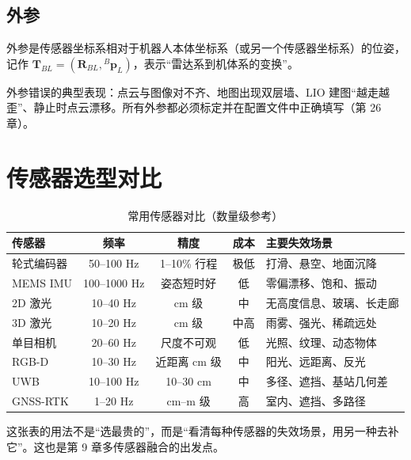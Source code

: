\subsection{外参}

\begin{definition}[外参]
外参是传感器坐标系相对于机器人本体坐标系（或另一个传感器坐标系）的位姿，记作 $\bm{T}_{BL}=(\bm{R}_{BL},{}^{B}\bm{p}_{L})$，表示“雷达系到机体系的变换”。
\end{definition}

外参错误的典型表现：点云与图像对不齐、地图出现双层墙、LIO 建图“越走越歪”、静止时点云漂移。所有外参都必须标定并在配置文件中正确填写（第 26 章）。

\section{传感器选型对比}\label{sec:03-compare}

\begin{table}[htbp]
  \centering
  \caption{常用传感器对比（数量级参考）}\label{tab:03-compare}
  \small
  \begin{tabular}{lcccl}
    \toprule
    传感器 & 频率 & 精度 & 成本 & 主要失效场景 \\
    \midrule
    轮式编码器 & 50--100 Hz & 1--10\% 行程 & 极低 & 打滑、悬空、地面沉降 \\
    MEMS IMU & 100--1000 Hz & 姿态短时好 & 低 & 零偏漂移、饱和、振动 \\
    2D 激光 & 10--40 Hz & cm 级 & 中 & 无高度信息、玻璃、长走廊 \\
    3D 激光 & 10--20 Hz & cm 级 & 中高 & 雨雾、强光、稀疏远处 \\
    单目相机 & 20--60 Hz & 尺度不可观 & 低 & 光照、纹理、动态物体 \\
    RGB-D & 10--30 Hz & 近距离 cm 级 & 中 & 阳光、远距离、反光 \\
    UWB & 10--100 Hz & 10--30 cm & 中 & 多径、遮挡、基站几何差 \\
    GNSS-RTK & 1--20 Hz & cm--m 级 & 高 & 室内、遮挡、多路径 \\
    \bottomrule
  \end{tabular}
\end{table}

这张表的用法不是“选最贵的”，而是“看清每种传感器的失效场景，用另一种去补它”。这也是第 9 章多传感器融合的出发点。

